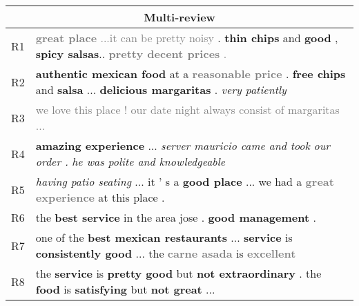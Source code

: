 \begin{table}[th]
      \centering
		\small
		\begin{tabular}{|m{0.4cm}<{\centering}|m{6.4cm}|}
			\hline
		    \multicolumn{2}{|c|}{\rule{0pt}{10pt} \bf Multi-review}  \\	
			\hline
			R1 & \textcolor{gray}{\textbf{great place}}  \textcolor{gray}{...it can be pretty noisy }. \textbf{thin chips} and \textbf{good} , \textbf{spicy salsas}..
			\textcolor{gray}{\textbf{pretty decent prices} .} \\
			\hline
		    R2 &\textbf{authentic mexican food} at a \textcolor{gray}{\textbf{reasonable price}} . \textbf{free chips} and \textbf{salsa} ...  \textbf{delicious margaritas} . \textit{very patiently}\\
		     \hline
			 R3 &\textcolor{gray}{we love this place ! our date night always consist of margaritas ...} \\
			\hline
			R4 &\textbf{amazing experience} ... \textit{server mauricio came and took our order .} \textit{he was polite and knowledgeable} \\
			\hline
	    	R5 & \textit{having patio seating} ... it ' s a \textbf{good place} ... we had a \textcolor{gray}{\textbf{great experience}} at this place . \\
			\hline
		   R6 &the \textbf{best service} in the area jose . \color{gray}{consistently great . } \textbf{good management} .\\
			\hline
			R7 &one of the \textbf{best mexican restaurants} ... \textbf{service} is \textbf{consistently good} ... the \textcolor{gray}{\textbf{carne asada}} is \textcolor{gray}{\textbf{excellent}} \\
			\hline
			R8 &the \textbf{service} is \textbf{pretty good} but \textbf{not extraordinary} . the \textbf{food} is \textbf{satisfying} but \textbf{not great} ...\\
			\hline 
		    \end{tabular}
	        

\end{table}
